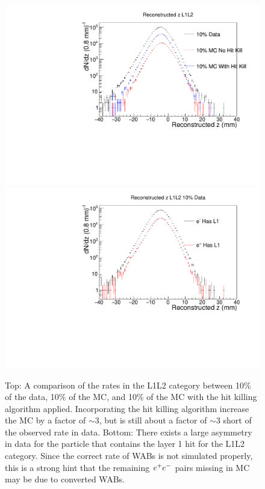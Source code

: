 \begin{figure}[t]
    \centering
    \includegraphics[width=.8\textwidth]{figs/selection/L1L2_compare.pdf}
    \includegraphics[width=.8\textwidth]{figs/selection/10per_L1L2_elepos.pdf}
    \caption{Top: A comparison of the rates in the L1L2 category between 10\% of the data, 10\% of the MC, and 10\% of the MC with the hit killing algorithm applied. Incorporating the hit killing algorithm increase the MC by a factor of $\sim$3, but is still about a factor of $\sim$3 short of the observed rate in data. Bottom: There exists a large asymmetry in data for the particle that contains the layer 1 hit for the L1L2 category. Since the correct rate of WABs is not simulated properly, this is a strong hint that the remaining $e^{+}e^{-}$ pairs missing in MC may be due to converted WABs.}
    \label{fig:rate_L1L2}
\end{figure}

